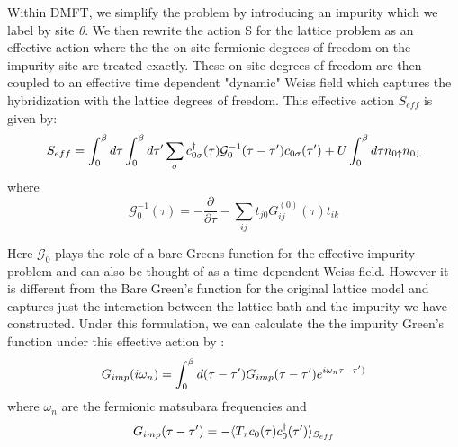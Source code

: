 \documentclass[10pt]{ruthesis}
\begin{document}
Within DMFT, we simplify the problem by introducing an impurity which we label by site \textit{0}. We then rewrite the action S for the lattice problem as an effective action where the the on-site fermionic degrees of freedom on the impurity site are treated exactly. These on-site degrees of freedom are then coupled to an effective time dependent "dynamic" Weiss field which captures the hybridization with the lattice degrees of freedom.  This effective action $S_{eff}$ is given by:
\begin{equation} \label{S_eff}
 S_{eff}= \int_{0}^{\beta} d\tau \int_{0}^{\beta} d \tau' \sum_{\sigma} c^{\dagger}_{0\sigma}(\tau) \mathcal{G}_{0}^{-1}(\tau -\tau') c_{0\sigma}(\tau') +U \int_{0}^{\beta} d\tau n_{0\uparrow} n_{0 \downarrow}
 \end{equation} 
where 
 \begin{equation}\label{G0_imp}
  \mathcal{G}_{0}^{-1}(\tau)= -\dfrac{\partial} {\partial \tau} -\sum_{ij} t_{j0} G^{(0)} _{ij} (\tau) t_{ik}
 \end{equation} 
  
Here $\mathcal{G}_0$ plays the role of a bare Greens function for the effective impurity problem and can also be thought of as a time-dependent Weiss field. However it is different from the Bare Green's function for the original lattice model and captures just the interaction between the lattice bath and the impurity we have constructed. Under this formulation, we can calculate the the impurity Green's function under this effective action by :
\begin{equation}
G_{imp}(i \omega_n)=\int_{0}^{\beta} d(\tau - \tau') G_{imp}(\tau - \tau') e^{i\omega_n \tau - \tau') }
\end{equation}
where $\omega_n$ are the fermionic matsubara frequencies and
\begin{equation}
G_{imp}(\tau - \tau')= - \langle T_{\tau} c_0(\tau) c^{\dagger}_0(\tau') \rangle _{S_{eff}}
\end{equation}
\end{document}

